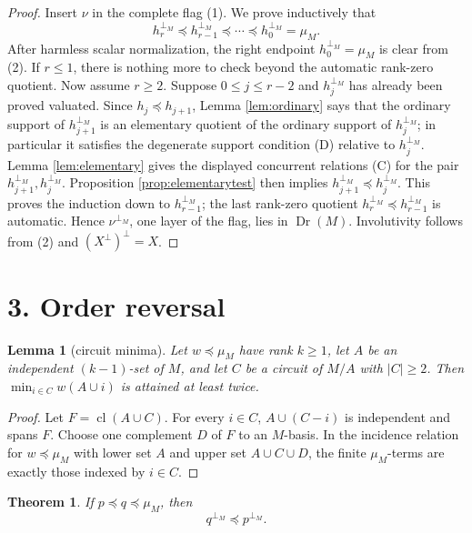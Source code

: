 \documentclass[12pt]{article}
\newcommand{\Dr}{\operatorname{Dr}}
\newcommand{\cl}{\operatorname{cl}}
\newtheorem{theorem}{Theorem}
\newtheorem{lemma}{Lemma}
\begin{document}
\begin{proof}
Insert $\nu$ in the complete flag (1).  We prove inductively that
\[
        h_r^{\perp_M}\preceq h_{r-1}^{\perp_M}\preceq\cdots
        \preceq h_0^{\perp_M}=\mu_M .
\]
After harmless scalar normalization, the right endpoint
$h_0^{\perp_M}=\mu_M$ is clear from (2).  If $r\le1$, there is
nothing more to check beyond the automatic rank-zero quotient.  Now assume $r\ge2$.
Suppose $0\le j\le r-2$ and $h_j^{\perp_M}$ has
already been proved valuated.  Since $h_j\preceq h_{j+1}$, Lemma
\ref{lem:ordinary} says that the ordinary support of
$h_{j+1}^{\perp_M}$ is an elementary quotient of the ordinary support of
$h_j^{\perp_M}$; in particular it satisfies the degenerate support
condition (D) relative to $h_j^{\perp_M}$.  Lemma
\ref{lem:elementary} gives the displayed concurrent relations (C) for
the pair $h_{j+1}^{\perp_M},h_j^{\perp_M}$.  Proposition
\ref{prop:elementarytest} then implies
$h_{j+1}^{\perp_M}\preceq h_j^{\perp_M}$.  This proves the induction
down to $h_{r-1}^{\perp_M}$; the last rank-zero quotient
$h_r^{\perp_M}\preceq h_{r-1}^{\perp_M}$ is automatic.  Hence $\nu^{\perp_M}$, one layer of the flag, lies in
$\Dr(M)$.  Involutivity follows from (2) and $(X^\perp)^\perp=X$.
\end{proof}

\section*{3. Order reversal}

\begin{lemma}[circuit minima]\label{lem:circuit}
Let $w\preceq\mu_M$ have rank $k\ge1$, let $A$ be an independent
$(k-1)$-set of $M$, and let $C$ be a circuit of $M/A$ with $|C|\ge2$.
Then $\min_{i\in C}w(A\cup i)$ is attained at least twice.
\end{lemma}

\begin{proof}
Let $F=\cl(A\cup C)$.  For every $i\in C$, $A\cup(C-i)$ is independent
and spans $F$.  Choose one complement $D$ of $F$ to an $M$-basis.  In
the incidence relation for $w\preceq\mu_M$ with lower set $A$ and upper
set $A\cup C\cup D$, the finite $\mu_M$-terms are exactly those indexed
by $i\in C$.
\end{proof}

\begin{theorem}\label{thm:order}
If $p\preceq q\preceq\mu_M$, then
\[
        q^{\perp_M}\preceq p^{\perp_M}.
\]
\end{theorem}
\end{document}
